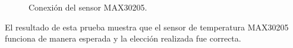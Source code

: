 \begin{figure}[htbp!]
	\centering
	\caption{Conexión del sensor MAX30205.}
	\label{fig:ResultadoTerminalMAX30205}
\end{figure}

El resultado de esta prueba muestra que el sensor de temperatura MAX30205 funciona de manera esperada y la elección realizada fue correcta.

\clearpage
